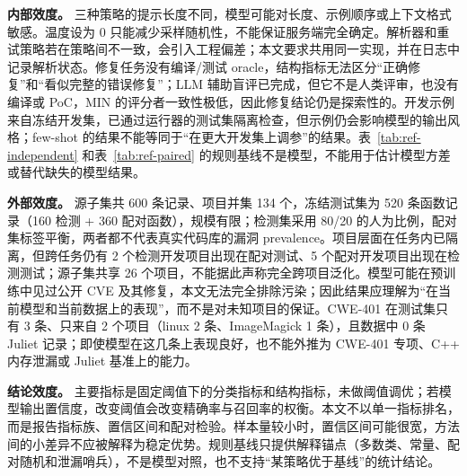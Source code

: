 \documentclass[conference]{IEEEtran}
\begin{document}
\textbf{内部效度。} 三种策略的提示长度不同，模型可能对长度、示例顺序或上下文格式敏感。温度设为 0 只能减少采样随机性，不能保证服务端完全确定。解析器和重试策略若在策略间不一致，会引入工程偏差；本文要求共用同一实现，并在日志中记录解析状态。修复任务没有编译/测试 oracle，结构指标无法区分“正确修复”和“看似完整的错误修复”；LLM 辅助盲评已完成，但它不是人类评审，也没有编译或 PoC，MIN 的评分者一致性极低，因此修复结论仍是探索性的。开发示例来自冻结开发集，已通过运行器的测试集隔离检查，但示例仍会影响模型的输出风格；few-shot 的结果不能等同于“在更大开发集上调参”的结果。表~\ref{tab:ref-independent} 和表~\ref{tab:ref-paired} 的规则基线不是模型，不能用于估计模型方差或替代缺失的模型结果。

\textbf{外部效度。} 源子集共 600 条记录、项目并集 134 个，冻结测试集为 520 条函数记录（160 检测 + 360 配对函数），规模有限；检测集采用 80/20 的人为比例，配对集标签平衡，两者都不代表真实代码库的漏洞 prevalence。项目层面在任务内已隔离，但跨任务仍有 2 个检测开发项目出现在配对测试、5 个配对开发项目出现在检测测试；源子集共享 26 个项目，不能据此声称完全跨项目泛化。模型可能在预训练中见过公开 CVE 及其修复，本文无法完全排除污染；因此结果应理解为“在当前模型和当前数据上的表现”，而不是对未知项目的保证。CWE-401 在测试集只有 3 条、只来自 2 个项目（linux 2 条、ImageMagick 1 条），且数据中 0 条 Juliet 记录；即使模型在这几条上表现良好，也不能外推为 CWE-401 专项、C++ 内存泄漏或 Juliet 基准上的能力。

\textbf{结论效度。} 主要指标是固定阈值下的分类指标和结构指标，未做阈值调优；若模型输出置信度，改变阈值会改变精确率与召回率的权衡。本文不以单一指标排名，而是报告指标族、置信区间和配对检验。样本量较小时，置信区间可能很宽，方法间的小差异不应被解释为稳定优势。规则基线只提供解释锚点（多数类、常量、配对随机和泄漏哨兵），不是模型对照，也不支持“某策略优于基线”的统计结论。
\end{document}
